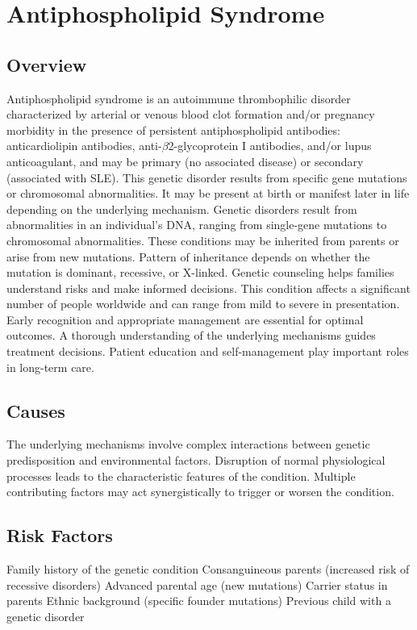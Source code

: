\chapter{Antiphospholipid Syndrome}
\label{sec:Antiphospholipid Syndrome}

\section{Overview}
Antiphospholipid syndrome is an autoimmune thrombophilic disorder characterized by arterial or venous blood clot formation and/or pregnancy morbidity in the presence of persistent antiphospholipid antibodies: anticardiolipin antibodies, anti-$\beta$2-glycoprotein I antibodies, and/or lupus anticoagulant, and may be primary (no associated disease) or secondary (associated with SLE). This genetic disorder results from specific gene mutations or chromosomal abnormalities. It may be present at birth or manifest later in life depending on the underlying mechanism. Genetic disorders result from abnormalities in an individual's DNA, ranging from single-gene mutations to chromosomal abnormalities. These conditions may be inherited from parents or arise from new mutations. Pattern of inheritance depends on whether the mutation is dominant, recessive, or X-linked. Genetic counseling helps families understand risks and make informed decisions. This condition affects a significant number of people worldwide and can range from mild to severe in presentation. Early recognition and appropriate management are essential for optimal outcomes. A thorough understanding of the underlying mechanisms guides treatment decisions. Patient education and self-management play important roles in long-term care.
\section{Causes}
The underlying mechanisms involve complex interactions between genetic predisposition and environmental factors. Disruption of normal physiological processes leads to the characteristic features of the condition. Multiple contributing factors may act synergistically to trigger or worsen the condition.
\section{Risk Factors}
Family history of the genetic condition Consanguineous parents (increased risk of recessive disorders) Advanced parental age (new mutations) Carrier status in parents Ethnic background (specific founder mutations) Previous child with a genetic disorder

